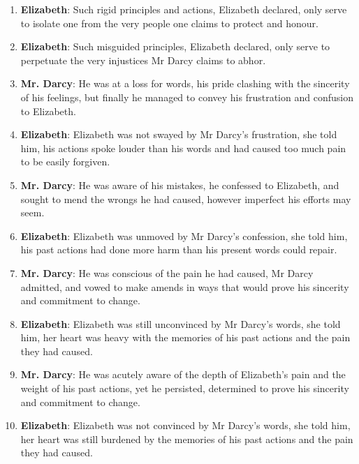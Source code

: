 \documentclass[10pt]{article}
\begin{document}
\begin{enumerate}
\item \textbf{Elizabeth}: Such rigid principles and actions, Elizabeth declared, only serve to isolate one from the very people one claims to protect and honour.

\item \textbf{Elizabeth}: Such misguided principles, Elizabeth declared, only serve to perpetuate the very injustices Mr Darcy claims to abhor.

\item \textbf{Mr. Darcy}: He was at a loss for words, his pride clashing with the sincerity of his feelings, but finally he managed to convey his frustration and confusion to Elizabeth.

\item \textbf{Elizabeth}: Elizabeth was not swayed by Mr Darcy's frustration, she told him, his actions spoke louder than his words and had caused too much pain to be easily forgiven.

\item \textbf{Mr. Darcy}: He was aware of his mistakes, he confessed to Elizabeth, and sought to mend the wrongs he had caused, however imperfect his efforts may seem.

\item \textbf{Elizabeth}: Elizabeth was unmoved by Mr Darcy's confession, she told him, his past actions had done more harm than his present words could repair.

\item \textbf{Mr. Darcy}: He was conscious of the pain he had caused, Mr Darcy admitted, and vowed to make amends in ways that would prove his sincerity and commitment to change.

\item \textbf{Elizabeth}: Elizabeth was still unconvinced by Mr Darcy's words, she told him, her heart was heavy with the memories of his past actions and the pain they had caused.

\item \textbf{Mr. Darcy}: He was acutely aware of the depth of Elizabeth's pain and the weight of his past actions, yet he persisted, determined to prove his sincerity and commitment to change.

\item \textbf{Elizabeth}: Elizabeth was not convinced by Mr Darcy's words, she told him, her heart was still burdened by the memories of his past actions and the pain they had caused.

\end{enumerate}
\end{document}
